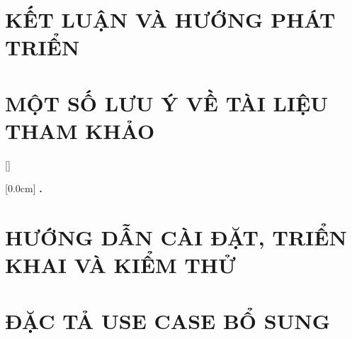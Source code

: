 \documentclass[a4paper,13pt,3p,twoside]{report}
\renewcommand{\bibname}{Danh sách tài liệu tham khảo}
\theoremstyle{definition}
\begin{document}
\chapter{KẾT LUẬN VÀ HƯỚNG PHÁT TRIỂN} %
\label{chapter:conclusion}


\newpage
\chapter*{MỘT SỐ LƯU Ý VỀ TÀI LIỆU THAM KHẢO} %
\label{chapter:reference}



\newpage
\renewcommand\bibname{TÀI LIỆU THAM KHẢO}
\printbibliography
{}

\appendixpage
\appendices
\addappheadtotoc


{}[]
\titlespacing*{\chapter}{0pt}{-20pt}{20pt}

    [0.0cm]             %
    {\bfseries\vspace{0.3cm}}                  %
    {{\bfseries{\scshape} \thecontentslabel.\ }} %
    {}         %
    {\contentspage}         %
\chapter{HƯỚNG DẪN CÀI ĐẶT, TRIỂN KHAI VÀ KIỂM THỬ}

\newpage
\chapter{ĐẶC TẢ USE CASE BỔ SUNG}

\end{document}
